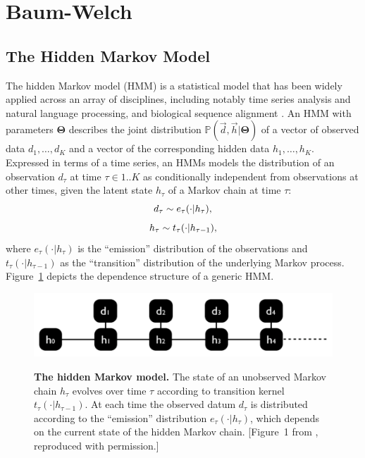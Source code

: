 \documentclass[preprint,12pt,authoryear]{elsarticle}
\newcommand{\Parameters}{\ensuremath{\bm{\Theta}}}
\newcommand{\datum}{\ensuremath{d}}
\newcommand{\hiddenState}{\ensuremath{h}}
\newcommand{\Time}{\ensuremath{\tau}}
\newcommand{\maxTime}{\ensuremath{K}}
\newcommand{\HMMtransitionLaw}{\ensuremath{t}}
\newcommand{\HMMemissionLaw}{\ensuremath{e}}
\newcommand{\Prob}{\ensuremath{\mathbb P}}
\begin{document}
\section{Baum-Welch}
\subsection{The Hidden Markov Model}
The hidden Markov model (HMM) is a statistical model that has been widely applied across an array of disciplines, including notably time series analysis and natural language processing, and biological sequence alignment \citep{Rabiner:1989,Churchill:1989eu,Baldi:1994, Krogh:1994lr,Liu:1999}. An HMM with parameters $\Parameters$ describes the joint distribution $\Prob( \vec{\datum}, \vec{\hiddenState} | \Parameters )$ of a vector of observed data $\datum_{1}, \dots, \datum_{\maxTime}$ and a vector of the corresponding hidden data $\hiddenState_{1}, \dots, \hiddenState_{\maxTime}$. Expressed in terms of a time series, an HMMs models the distribution of an observation $\datum_{\Time}$ at time $\Time \in 1..\maxTime$ as conditionally independent from observations at other times, given the latent state $\hiddenState_{\Time}$ of a Markov chain at time $\Time$:
\begin{equation}\label{cbw_eq:HMM_EmissionLaw}
\datum_{\Time} \sim \HMMemissionLaw_{\Time}( \cdot | \hiddenState_{\Time} ) \hbox{,}
\end{equation}
\begin{equation}\label{cbw_eq:HMM_TransitionLaw}
\hiddenState_{\Time} \sim \HMMtransitionLaw_{\Time}( \cdot | \hiddenState_{\Time - 1} ) \hbox{,}
\end{equation}
where $\HMMemissionLaw_{\Time}( \cdot | \hiddenState_{\Time} )$ is the ``emission'' distribution of the observations and $\HMMtransitionLaw_{\Time}( \cdot | \hiddenState_{\Time - 1} )$ as the ``transition'' distribution of the underlying Markov process.  Figure~\ref{cbw_fig:HMM} depicts the dependence structure of a generic HMM.

\begin{figure}[htp]
\centering
\includegraphics[scale=.5]{HMM.pdf} \\
 \caption{\textbf{The hidden Markov model.} The state of an unobserved Markov chain $\hiddenState_{\Time}$ evolves over time $\Time$ according to transition kernel $\HMMtransitionLaw_{\Time}( \cdot | \hiddenState_{\Time - 1} )$.  At each time the observed datum  $\datum_{\Time}$ is distributed according to the ``emission'' distribution $\HMMemissionLaw_{\Time}( \cdot | \hiddenState_{\Time} )$, which depends on the current state of the hidden Markov chain. [Figure~1 from \cite{edlefsen2010transposon}, reproduced with permission.]}
 \label{cbw_fig:HMM}
\end{figure}
\end{document}
